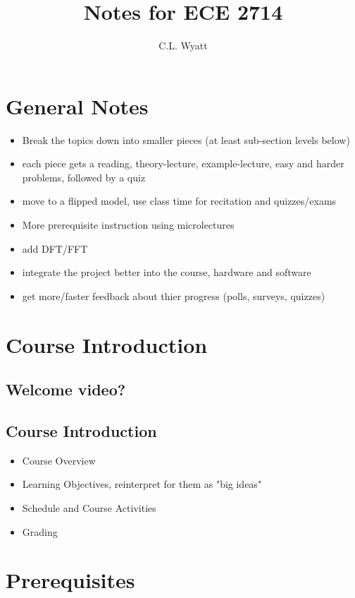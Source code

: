 \documentclass{article}
\title{Notes for ECE 2714}
\author{C.L. Wyatt}
\begin{document}
\maketitle
\newpage

\tableofcontents
\newpage

\section{General Notes}
\label{sec:orga870cf1}
\begin{itemize}
\item Break the topics down into smaller pieces (at least sub-section levels below)
\item each piece gets a reading, theory-lecture, example-lecture, easy and harder problems, followed by a quiz
\item move to a flipped model, use class time for recitation and quizzes/exams
\item More prerequisite instruction using microlectures
\item add DFT/FFT
\item integrate the project better into the course, hardware and software
\item get more/faster feedback about thier progress (polls, surveys, quizzes)
\end{itemize}
\section{Course Introduction}
\label{sec:orge7ac4df}
\subsection{Welcome video?}
\label{sec:orgb856200}
\subsection{Course Introduction}
\label{sec:org60282c3}
\begin{itemize}
\item Course Overview
\item Learning Objectives, reinterpret for them as "big ideas"
\item Schedule and Course Activities
\item Grading
\end{itemize}
\section{Prerequisites}
\label{sec:orgf9b63e5}
\end{document}
